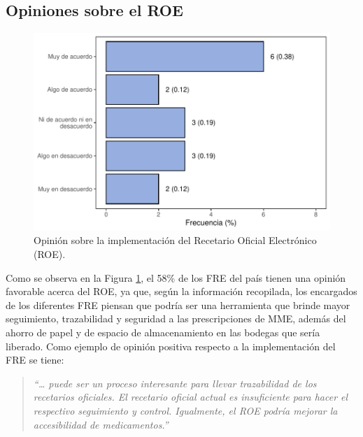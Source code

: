 \documentclass[
]{book}
\begin{document}
\hypertarget{opiniones-sobre-el-roe}{%
\subsection{Opiniones sobre el ROE}\label{opiniones-sobre-el-roe}}

\begin{figure}[t]

{\centering \includegraphics[width=0.85\linewidth]{InformeFinal_files/figure-latex/FREImplementacionROE-1} 

}

\caption{Opinión sobre la implementación del Recetario Oficial Electrónico (ROE).}\label{fig:FREImplementacionROE}
\end{figure}

Como se observa en la Figura \ref{fig:FREImplementacionROE}, el 58\% de los FRE del país tienen una opinión favorable acerca del ROE, ya que, según la información recopilada, los encargados de los diferentes FRE piensan que podría ser una herramienta que brinde mayor seguimiento, trazabilidad y seguridad a las prescripciones de MME, además del ahorro de papel y de espacio de almacenamiento en las bodegas que sería liberado. Como ejemplo de opinión positiva respecto a la implementación del FRE se tiene:

\begin{quote}
\emph{``\ldots{} puede ser un proceso interesante para llevar trazabilidad de los recetarios oficiales. El recetario oficial actual es insuficiente para hacer el respectivo seguimiento y control. Igualmente, el ROE podría mejorar la accesibilidad de medicamentos.''}
\end{quote}
\end{document}
